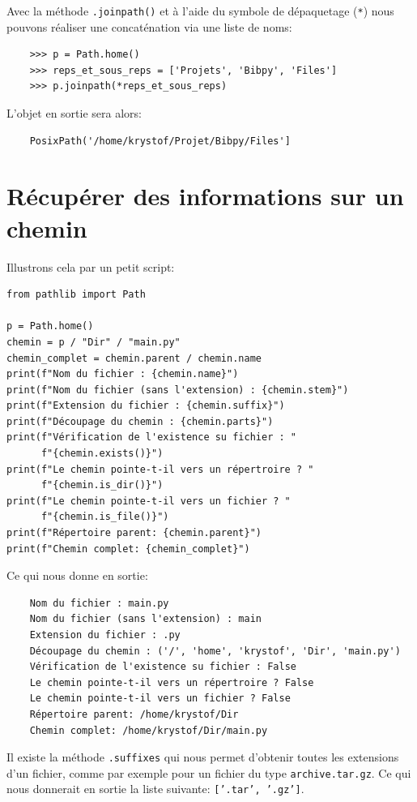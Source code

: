 \documentclass[a4paper,11pt]{book}
\begin{document}
Avec la méthode \texttt{.joinpath()} et à l'aide du symbole de dépaquetage (\texttt{*}) nous pouvons réaliser une concaténation via une liste de noms:
\begin{verbatim}
    >>> p = Path.home()
    >>> reps_et_sous_reps = ['Projets', 'Bibpy', 'Files']
    >>> p.joinpath(*reps_et_sous_reps)
\end{verbatim}
\medskip

L'objet en sortie sera alors:
\begin{verbatim}
    PosixPath('/home/krystof/Projet/Bibpy/Files']
\end{verbatim}
\medskip

\section{Récupérer des informations sur un chemin}
Illustrons cela par un petit script:
\begin{lstlisting}[caption=Script avec recueils d'informations]
from pathlib import Path

p = Path.home()
chemin = p / "Dir" / "main.py"
chemin_complet = chemin.parent / chemin.name
print(f"Nom du fichier : {chemin.name}")
print(f"Nom du fichier (sans l'extension) : {chemin.stem}")
print(f"Extension du fichier : {chemin.suffix}")
print(f"Découpage du chemin : {chemin.parts}")
print(f"Vérification de l'existence su fichier : "
      f"{chemin.exists()}")
print(f"Le chemin pointe-t-il vers un répertroire ? "
      f"{chemin.is_dir()}")
print(f"Le chemin pointe-t-il vers un fichier ? "
      f"{chemin.is_file()}")
print(f"Répertoire parent: {chemin.parent}")
print(f"Chemin complet: {chemin_complet}")
\end{lstlisting}
\medskip

Ce qui nous donne en sortie:
\begin{verbatim}
    Nom du fichier : main.py
    Nom du fichier (sans l'extension) : main
    Extension du fichier : .py
    Découpage du chemin : ('/', 'home', 'krystof', 'Dir', 'main.py')
    Vérification de l'existence su fichier : False
    Le chemin pointe-t-il vers un répertroire ? False
    Le chemin pointe-t-il vers un fichier ? False
    Répertoire parent: /home/krystof/Dir
    Chemin complet: /home/krystof/Dir/main.py
\end{verbatim}
\medskip

Il existe la méthode \texttt{.suffixes} qui nous permet d'obtenir toutes les extensions d'un fichier, comme par exemple pour un fichier du type \texttt{archive.tar.gz}. Ce qui nous donnerait en sortie la liste suivante: \texttt{['.tar', '.gz']}.
\medskip
\end{document}
